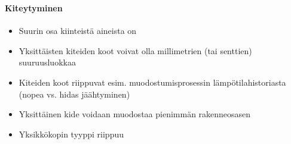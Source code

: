 \begin{frame}
\frametitle{\texorpdfstring{\culine[\sectiontitleulinecolor]{\sectiontitle}}{\sectiontitle} }
\framesubtitle{Kiteytyminen}
\appear{}

\begin{itemize}[itemsep=1.9mm]
	\item Suurin osa kiinteistä aineista on 

\item Yksittäisten kiteiden koot voivat olla millimetrien (tai senttien) suuruusluokkaa 

\item Kiteiden koot riippuvat esim. muodostumisprosessin lämpötilahistoriasta (nopea vs. hidas jäähtyminen) 

\item Yksittäinen kide voidaan muodostaa pienimmän rakenneosasen

\item Yksikkökopin tyyppi riippuu  
\end{itemize}

\endofslide 
\end{frame}

